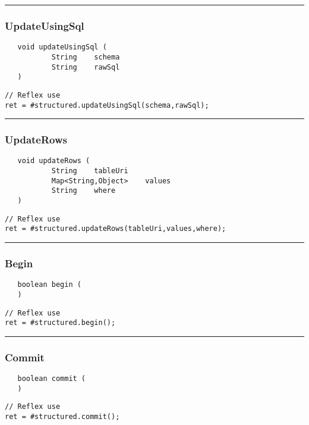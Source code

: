 \rule{15cm}{2pt}
\subsubsection{UpdateUsingSql}
\label{Api:UpdateUsingSql}
\begin{verbatim}
   void updateUsingSql (
           String    schema
           String    rawSql
   )
\end{verbatim}
\begin{lstlisting}[language=reflex]
// Reflex use
ret = #structured.updateUsingSql(schema,rawSql);
\end{lstlisting}



\rule{15cm}{2pt}
\subsubsection{UpdateRows}
\label{Api:UpdateRows}
\begin{verbatim}
   void updateRows (
           String    tableUri
           Map<String,Object>    values
           String    where
   )
\end{verbatim}
\begin{lstlisting}[language=reflex]
// Reflex use
ret = #structured.updateRows(tableUri,values,where);
\end{lstlisting}



\rule{15cm}{2pt}
\subsubsection{Begin}
\label{Api:Begin}
\begin{verbatim}
   boolean begin (
   )
\end{verbatim}
\begin{lstlisting}[language=reflex]
// Reflex use
ret = #structured.begin();
\end{lstlisting}



\rule{15cm}{2pt}
\subsubsection{Commit}
\label{Api:Commit}
\begin{verbatim}
   boolean commit (
   )
\end{verbatim}
\begin{lstlisting}[language=reflex]
// Reflex use
ret = #structured.commit();
\end{lstlisting}



